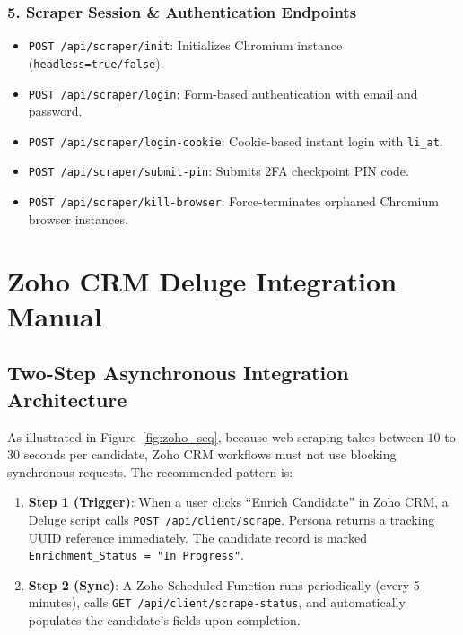 \documentclass[11pt,a4paper]{report}
\begin{document}
\subsection{5. Scraper Session \& Authentication Endpoints}
\begin{itemize}[noitemsep, topsep=2pt]
    \item \texttt{POST /api/scraper/init}: Initializes Chromium instance (\texttt{headless=true/false}).
    \item \texttt{POST /api/scraper/login}: Form-based authentication with email and password.
    \item \texttt{POST /api/scraper/login-cookie}: Cookie-based instant login with \texttt{li\_at}.
    \item \texttt{POST /api/scraper/submit-pin}: Submits 2FA checkpoint PIN code.
    \item \texttt{POST /api/scraper/kill-browser}: Force-terminates orphaned Chromium browser instances.
\end{itemize}

\chapter{Zoho CRM Deluge Integration Manual}

\section{Two-Step Asynchronous Integration Architecture}
As illustrated in Figure~\ref{fig:zoho_seq}, because web scraping takes between $10$ to $30$ seconds per candidate, Zoho CRM workflows must not use blocking synchronous requests. The recommended pattern is:
\begin{enumerate}[leftmargin=*]
    \item \textbf{Step 1 (Trigger)}: When a user clicks ``Enrich Candidate'' in Zoho CRM, a Deluge script calls \texttt{POST /api/client/scrape}. Persona returns a tracking UUID reference immediately. The candidate record is marked \texttt{Enrichment\_Status = "In Progress"}.
    \item \textbf{Step 2 (Sync)}: A Zoho Scheduled Function runs periodically (every 5 minutes), calls \texttt{GET /api/client/scrape-status}, and automatically populates the candidate's fields upon completion.
\end{enumerate}
\end{document}
